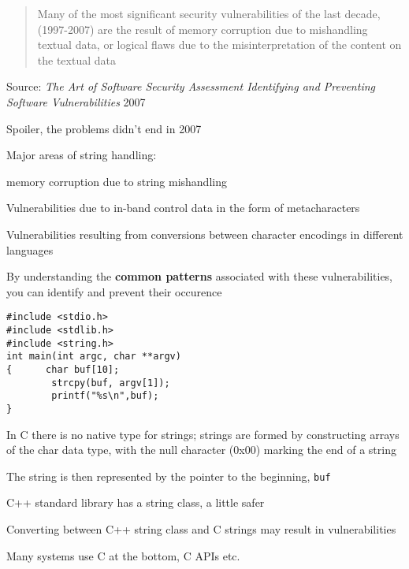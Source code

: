 \documentclass[Screen16to9,17pt]{foils}
\begin{document}

\begin{quote}
Many of the most significant security vulnerabilities of the last decade, (1997-2007) are the result of memory corruption due to mishandling textual data, or logical flaws due to the misinterpretation of the content on the textual data
\end{quote}
Source: \emph{The Art of Software Security Assessment Identifying and Preventing
Software Vulnerabilities} 2007

\begin{list1}
\item Spoiler, the problems didn't end in 2007
\item Major areas of string handling:
\begin{list2}
\item memory corruption due to string mishandling
\item Vulnerabilities due to in-band control data in the form of metacharacters
\item Vulnerabilities resulting from conversions between character encodings in different languages
\end{list2}
\item By understanding the {\bf common patterns} associated with these vulnerabilities, you can identify and prevent their occurence
\end{list1}



\begin{verbatim}
#include <stdio.h>
#include <stdlib.h>
#include <string.h>
int main(int argc, char **argv)
{      char buf[10];
        strcpy(buf, argv[1]);
        printf("%s\n",buf);
}
\end{verbatim}


\begin{list2}
\item In C there is no native type for strings; strings are formed by constructing arrays of the char data type, with the null character (0x00) marking the end of a string
\item The string is then represented by the pointer to the beginning, \verb+buf+
\item C++ standard library has a string class, a little safer
\item Converting between C++ string class and C strings may result in vulnerabilities
\item Many systems use C at the bottom, C APIs etc.
\end{list2}
\end{document}
